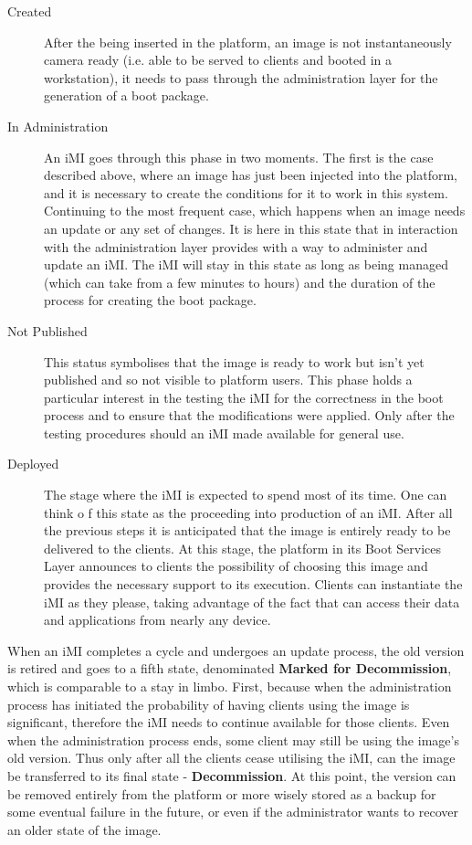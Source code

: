 \begin{description}
	\item [Created] After the being inserted in the platform, an image is not instantaneously camera ready (i.e. able to be served to clients and booted in a workstation), it needs to pass through the administration layer for the generation of a boot package. 
	\item [In Administration] An iMI goes through this phase in two moments. The first is the case described above, where an image has just been injected into the platform, and it is necessary to create the conditions for it to work in this system. Continuing to the most frequent case, which happens when an image needs an update or any set of changes. It is here in this state that in interaction with the administration layer provides with a way to administer and update an iMI. The iMI will stay in this state as long as being managed (which can take from a few minutes to hours) and the duration of the process for creating the boot package.
	\item [Not Published] This status symbolises that the image is ready to work but isn't yet published and so not visible to platform users. This phase holds a particular interest in the testing the iMI for the correctness in the boot process and to ensure that the modifications were applied. Only after the testing procedures should an iMI made available for general use.
	\item [Deployed] The stage where the iMI is expected to spend most of its time. One can think o   f this state as the proceeding into production of an iMI. After all the previous steps it is anticipated that the image is entirely ready to be delivered to the clients. At this stage, the platform in its Boot Services Layer announces to clients the possibility of choosing this image and provides the necessary support to its execution. Clients can instantiate the iMI as they please, taking advantage of the fact that can access their data and applications from nearly any device.
\end{description}

When an iMI completes a cycle and undergoes an update process, the old version is retired and goes to a fifth state, denominated \textbf{Marked for Decommission}, which is comparable to a stay in limbo. First, because when the administration process has initiated the probability of having clients using the image is significant, therefore the iMI needs to continue available for those clients. Even when the administration process ends, some client may still be using the image's old version. Thus only after all the clients cease utilising the iMI, can the image be transferred to its final state - \textbf{Decommission}. At this point, the version can be removed entirely from the platform or more wisely stored as a backup for some eventual failure in the future, or even if the administrator wants to recover an older state of the image.






